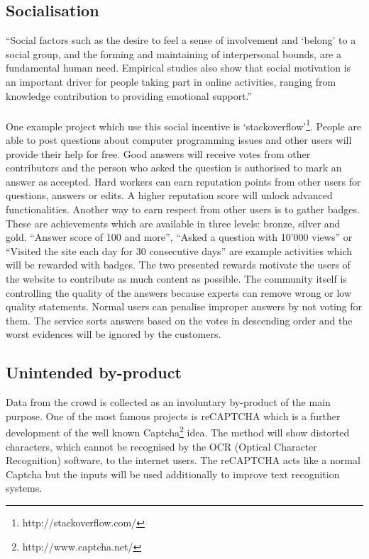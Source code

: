 \subsection{Socialisation}
``Social factors such as the desire to feel a sense of involvement and `belong' to a social group, and the forming and maintaining of interpersonal bounds, are a fundamental human need. Empirical studies also show that social motivation is an important driver for people taking part in online activities, ranging from knowledge contribution to providing emotional support.'' \cite{yu} \\
\\
One example project which use this social incentive is `stackoverflow'\footnote{http://stackoverflow.com/}. People are able to post questions about computer programming issues and other users will provide their help for free. Good answers will receive votes from other contributors and the person who asked the question is authorised to mark an answer as accepted. Hard workers can earn reputation points from other users for questions, answers or edits. A higher reputation score will unlock advanced functionalities. Another way to earn respect from other users is to gather badges. These are achievements which are available in three levels: bronze, silver and gold. ``Answer score of 100 and more'', ``Asked a question with 10'000 views'' or ``Visited the site each day for 30 consecutive days'' are example activities which will be rewarded with badges. The two presented rewards motivate the users of the website to contribute as much content as possible. The community itself is controlling the quality of the answers because experts can remove wrong or low quality statements. Normal users can penalise improper answers by not voting for them. The service sorts answers based on the votes in descending order and the worst evidences will be ignored by the customers.

\subsection{Unintended by-product}
Data from the crowd is collected as an involuntary by-product of the main purpose. One of the most famous projects is reCAPTCHA\cite{recaptcha} which is a further development of the well known Captcha\footnote{http://www.captcha.net/} idea. The method will show distorted characters, which cannot be recognised by the OCR (Optical Character Recognition) software, to the internet users. The reCAPTCHA acts like a normal Captcha but the inputs will be used additionally to improve text recognition systems.

